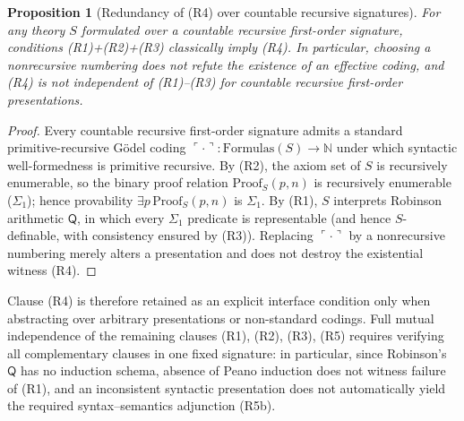 \documentclass[11pt]{article}
\theoremstyle{plain}
\newtheorem{proposition}[theorem]{Proposition}
\theoremstyle{definition}
\begin{document}
\begin{proposition}[Redundancy of (R4) over countable recursive signatures]\label{prop:rs-independence}
For any theory $S$ formulated over a countable recursive first-order signature, conditions \textup{(R1)+(R2)+(R3)} classically imply \textup{(R4)}. In particular, choosing a nonrecursive numbering does not refute the existence of an effective coding, and \textup{(R4)} is not independent of \textup{(R1)--(R3)} for countable recursive first-order presentations.
\end{proposition}
\begin{proof}
Every countable recursive first-order signature admits a standard primitive-recursive G\"odel coding $\ulcorner \cdot \urcorner : \mathrm{Formulas}(S) \to \mathbb{N}$ under which syntactic well-formedness is primitive recursive. By (R2), the axiom set of $S$ is recursively enumerable, so the binary proof relation $\mathrm{Proof}_S(p, n)$ is recursively enumerable ($\Sigma_1$); hence provability $\exists p\,\mathrm{Proof}_S(p, n)$ is $\Sigma_1$. By (R1), $S$ interprets Robinson arithmetic $\mathsf{Q}$, in which every $\Sigma_1$ predicate is representable (and hence $S$-definable, with consistency ensured by (R3)). Replacing $\ulcorner \cdot \urcorner$ by a nonrecursive numbering merely alters a presentation and does not destroy the existential witness (R4).
\end{proof}
Clause (R4) is therefore retained as an explicit interface condition only when abstracting over arbitrary presentations or non-standard codings. Full mutual independence of the remaining clauses (R1), (R2), (R3), (R5) requires verifying all complementary clauses in one fixed signature: in particular, since Robinson's $\mathsf{Q}$ has no induction schema, absence of Peano induction does not witness failure of (R1), and an inconsistent syntactic presentation does not automatically yield the required syntax--semantics adjunction (R5b).
\end{document}
